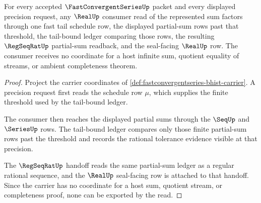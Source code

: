 \begin{theorem}
\label{thm:fastconvergentseries-tail-sum-boundary}
For every accepted $\FastConvergentSeriesUp$ packet and every displayed precision request, any $\RealUp$ consumer read of the represented sum factors through one fast tail schedule row, the displayed partial-sum rows past that threshold, the tail-bound ledger comparing those rows, the resulting $\RegSeqRatUp$ partial-sum readback, and the seal-facing $\RealUp$ row. The consumer receives no coordinate for a host infinite sum, quotient equality of streams, or ambient completeness theorem.
\end{theorem}
\begin{proof}
Project the carrier coordinates of \autoref{def:fastconvergentseries-bhist-carrier}. A precision request first reads the schedule row $\mu$, which supplies the finite threshold used by the tail-bound ledger.

The consumer then reaches the displayed partial sums through the $\SeqUp$ and $\SeriesUp$ rows. The tail-bound ledger compares only those finite partial-sum rows past the threshold and records the rational tolerance evidence visible at that precision.

The $\RegSeqRatUp$ handoff reads the same partial-sum ledger as a regular rational sequence, and the $\RealUp$ seal-facing row is attached to that handoff. Since the carrier has no coordinate for a host sum, quotient stream, or completeness proof, none can be exported by the read.
\end{proof}

